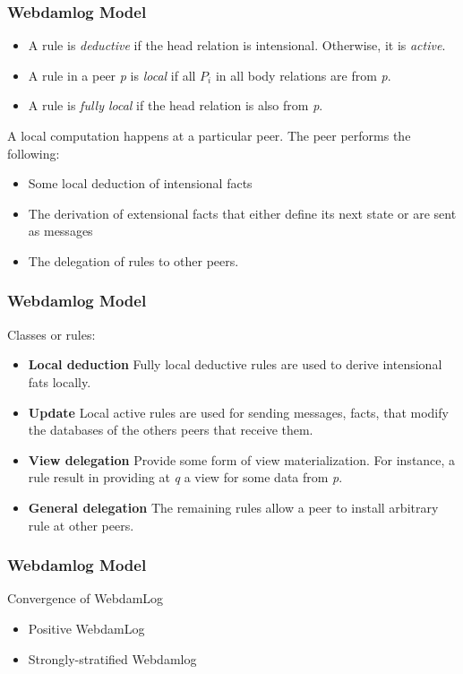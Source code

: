 \documentclass{beamer}
\begin{document}
\frame
{
	\frametitle{Webdamlog Model}
	
	\begin{itemize}
		\item A rule is \textit{deductive} if the head relation is intensional. Otherwise, it is \textit{active}.
		\item A rule in a peer \textit{p} is \textit{local} if all $P_{i}$ in all body relations are from \textit{p}.
		\item A rule is \textit{fully local} if the head relation is also from \textit{p}.
	\end{itemize}
	
	A local computation happens at a particular peer. The peer performs the following:
	\begin{itemize}
		\item Some local deduction of intensional facts
		\item The derivation of extensional facts that either define its next state or are sent as messages
		\item The delegation of rules to other peers.
	\end{itemize}

}

\frame
{
	\frametitle{Webdamlog Model}

	Classes or rules:
	\begin{itemize}
		\item \textbf{Local deduction} Fully local deductive rules are used to derive intensional fats locally.
		\item \textbf{Update} Local active rules are used for sending messages, facts, that modify the databases of the others peers that receive them.
		\item \textbf{View delegation} Provide some form of view materialization. For instance, a rule result in providing at \textit{q} a view for some data from \textit{p}.
		\item \textbf{General delegation} The remaining rules allow a peer to install arbitrary rule at other peers.
	\end{itemize}

}

\frame
{
	\frametitle{Webdamlog Model}

	Convergence of WebdamLog
	\begin{itemize}
		\item Positive WebdamLog
		\item Strongly-stratified Webdamlog
	\end{itemize}





}
\end{document}
